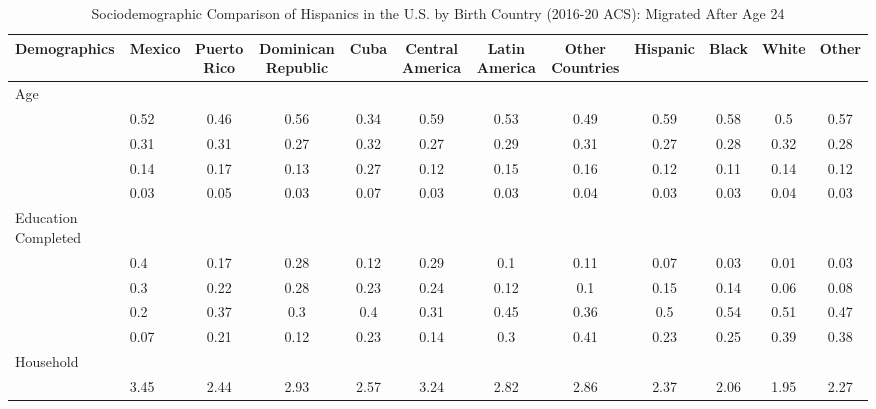 \documentclass[
]{article}
\begin{document}
\begin{landscape}

\begin{table}[ht]
\centering
\caption{Sociodemographic Comparison of Hispanics in the U.S. by Birth Country (2016-20 ACS): Migrated After Age 24} 
\begingroup\small
\begin{tabular}{>{\raggedright\arraybackslash}p{3.2cm}|lcccccc|cccc}
  \hline
Demographics & Mexico & Puerto Rico & Dominican Republic & Cuba & Central America & Latin America & Other Countries & Hispanic & Black & White & Other \\ 
  \hline
Age &  &  &  &  &  &  &  &  &  &  &  \\ 
  \multicolumn{1}{>{\raggedleft\arraybackslash}p{1.5cm}|}{\makebox[1.5cm][r]{60 - 69 }}& 0.52 & 0.46 & 0.56 & 0.34 & 0.59 & 0.53 & 0.49 & 0.59 & 0.58 & 0.5 & 0.57 \\ 
  \multicolumn{1}{>{\raggedleft\arraybackslash}p{1.5cm}|}{\makebox[1.5cm][r]{70 - 79 }}& 0.31 & 0.31 & 0.27 & 0.32 & 0.27 & 0.29 & 0.31 & 0.27 & 0.28 & 0.32 & 0.28 \\ 
  \multicolumn{1}{>{\raggedleft\arraybackslash}p{1.5cm}|}{\makebox[1.5cm][r]{80 - 89 }}& 0.14 & 0.17 & 0.13 & 0.27 & 0.12 & 0.15 & 0.16 & 0.12 & 0.11 & 0.14 & 0.12 \\ 
  \multicolumn{1}{>{\raggedleft\arraybackslash}p{1.5cm}|}{\makebox[1.5cm][r]{90 plus }}& 0.03 & 0.05 & 0.03 & 0.07 & 0.03 & 0.03 & 0.04 & 0.03 & 0.03 & 0.04 & 0.03 \\ 
  Education Completed &  &  &  &  &  &  &  &  &  &  &  \\ 
  \multicolumn{1}{>{\raggedleft\arraybackslash}p{3.2cm}|}{\makebox[3.2cm][r]{Less than Primary }}& 0.4 & 0.17 & 0.28 & 0.12 & 0.29 & 0.1 & 0.11 & 0.07 & 0.03 & 0.01 & 0.03 \\ 
  \multicolumn{1}{>{\raggedleft\arraybackslash}p{1.7cm}|}{\makebox[1.7cm][r]{Primary }}& 0.3 & 0.22 & 0.28 & 0.23 & 0.24 & 0.12 & 0.1 & 0.15 & 0.14 & 0.06 & 0.08 \\ 
  \multicolumn{1}{>{\raggedleft\arraybackslash}p{2cm}|}{\makebox[2cm][r]{Secondary }}& 0.2 & 0.37 & 0.3 & 0.4 & 0.31 & 0.45 & 0.36 & 0.5 & 0.54 & 0.51 & 0.47 \\ 
  \multicolumn{1}{>{\raggedleft\arraybackslash}p{2cm}|}{\makebox[2cm][r]{University }}& 0.07 & 0.21 & 0.12 & 0.23 & 0.14 & 0.3 & 0.41 & 0.23 & 0.25 & 0.39 & 0.38 \\ 
  Household &  &  &  &  &  &  &  &  &  &  &  \\ 
  \multicolumn{1}{>{\raggedleft\arraybackslash}p{2.7cm}|}{\makebox[2.7cm][r]{Household Size }}& 3.45 & 2.44 & 2.93 & 2.57 & 3.24 & 2.82 & 2.86 & 2.37 & 2.06 & 1.95 & 2.27 \\ 

\end{tabular}
\end{table}
\end{landscape}
\end{document}
